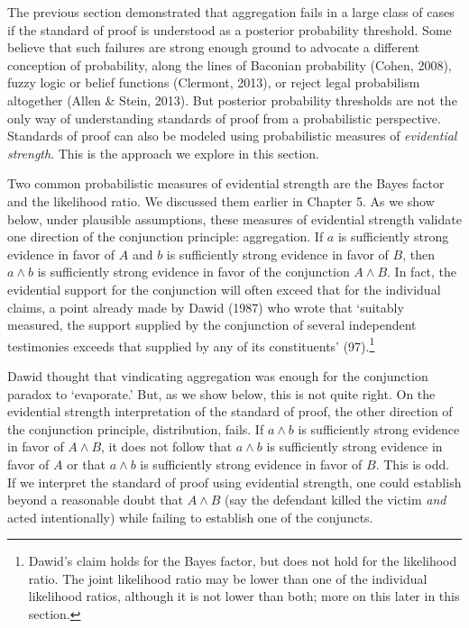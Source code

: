 \documentclass[
  10pt,
  dvipsnames,enabledeprecatedfontcommands]{scrartcl}
\begin{document}
\label{sec:strength}

The previous section demonstrated that aggregation fails in a large
class of cases if the standard of proof is understood as a posterior
probability threshold. Some believe that such failures are strong enough
ground to advocate a different conception of probability, along the
lines of Baconian probability (Cohen, 2008), fuzzy logic or belief
functions (Clermont, 2013), or reject legal probabilism altogether
(Allen \& Stein, 2013). But posterior probability thresholds are not the
only way of understanding standards of proof from a probabilistic
perspective. Standards of proof can also be modeled using probabilistic
measures of \textit{evidential strength}. This is the approach we
explore in this section.

Two common probabilistic measures of evidential strength are the Bayes
factor and the likelihood ratio. We discussed them earlier in Chapter 5.
 As we show below, under plausible
assumptions, these measures of evidential strength validate one
direction of the conjunction principle: aggregation. If \(a\) is
sufficiently strong evidence in favor of \(A\) and \(b\) is sufficiently
strong evidence in favor of \(B\), then \(a\wedge b\) is sufficiently
strong evidence in favor of the conjunction \(A \wedge B\). In fact, the
evidential support for the conjunction will often exceed that for the
individual claims, a point already made by Dawid (1987) who wrote that
`suitably measured, the support supplied by the conjunction of several
independent testimonies exceeds that supplied by any of its
constituents' (97).\footnote{Dawid's claim holds for the Bayes factor,
  but does not hold for the likelihood ratio. The joint likelihood ratio
  may be lower than one of the individual likelihood ratios, although it
  is not lower than both; more on this later in this section.}

Dawid thought that vindicating aggregation was enough for the
conjunction paradox to `evaporate.' But, as we show below, this is not
quite right. On the evidential strength interpretation of the standard
of proof, the other direction of the conjunction principle,
distribution, fails. If \(a \wedge b\) is sufficiently strong evidence
in favor of \(A \wedge B\), it does not follow that \(a\wedge b\) is
sufficiently strong evidence in favor of \(A\) or that \(a\wedge b\) is
sufficiently strong evidence in favor of \(B\). This is odd. If we
interpret the standard of proof using evidential strength, one could
establish beyond a reasonable doubt that \(A \wedge B\) (say the
defendant killed the victim \textit{and} acted intentionally) while
failing to establish one of the conjuncts.
\end{document}
